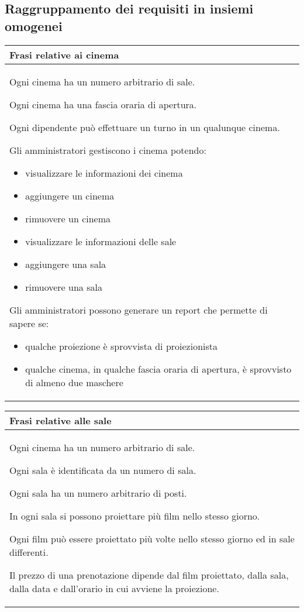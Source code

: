 \subsection*{Raggruppamento dei requisiti in insiemi omogenei}
%
%
\begin{tabularx}{\linewidth}{|X|}
      \hline
      \rowcolor{tblhdrcolor}
      \textbf{Frasi relative ai cinema} \\\hline
      Ogni cinema ha un numero arbitrario di sale.

      Ogni cinema ha una fascia oraria di apertura.

      Ogni dipendente può effettuare un turno in un qualunque cinema.

      Gli amministratori gestiscono i cinema potendo:
      \begin{itemize}
            \item visualizzare le informazioni dei cinema
            \item aggiungere un cinema
            \item rimuovere un cinema
            \item visualizzare le informazioni delle sale
            \item aggiungere una sala
            \item rimuovere una sala
      \end{itemize}

      Gli amministratori possono generare un report che permette di
      sapere se:
      \begin{itemize}
            \item qualche proiezione è sprovvista di proiezionista
            \item qualche cinema, in qualche fascia oraria di apertura,
                  è sprovvisto di almeno due maschere
      \end{itemize}
      \\ \hline
\end{tabularx}

\begin{tabularx}{\linewidth}{|X|}
      \hline
      \rowcolor{tblhdrcolor}
      \textbf{Frasi relative alle sale} \\\hline
      Ogni cinema ha un numero arbitrario di sale.

      Ogni sala è identificata da un numero di sala.

      Ogni sala ha un numero arbitrario di posti.

      In ogni sala si possono proiettare più film nello stesso giorno.

      Ogni film può essere proiettato più volte nello stesso giorno ed
      in sale differenti.

      Il prezzo di una prenotazione dipende dal film proiettato, dalla
      sala, dalla data e dall'orario in cui avviene la proiezione.
      \\ \hline
\end{tabularx}

